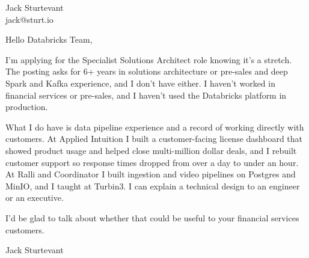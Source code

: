 \documentclass[11pt]{article}
\begin{document}
\raggedright

{\namefont\fontsize{20pt}{24pt}\selectfont Jack Sturtevant}\\[-0.3em]
jack@sturt.io

\vspace{1.2em}

Hello Databricks Team,

I'm applying for the Specialist Solutions Architect role knowing it's a stretch. The posting asks for 6+ years in solutions architecture or pre-sales and deep Spark and Kafka experience, and I don't have either. I haven't worked in financial services or pre-sales, and I haven't used the Databricks platform in production.

What I do have is data pipeline experience and a record of working directly with customers. At Applied Intuition I built a customer-facing license dashboard that showed product usage and helped close multi-million dollar deals, and I rebuilt customer support so response times dropped from over a day to under an hour. At Ralli and Coordinator I built ingestion and video pipelines on Postgres and MinIO, and I taught at Turbin3. I can explain a technical design to an engineer or an executive.

I'd be glad to talk about whether that could be useful to your financial services customers.

\vspace{0.6em}
Jack Sturtevant
\end{document}
